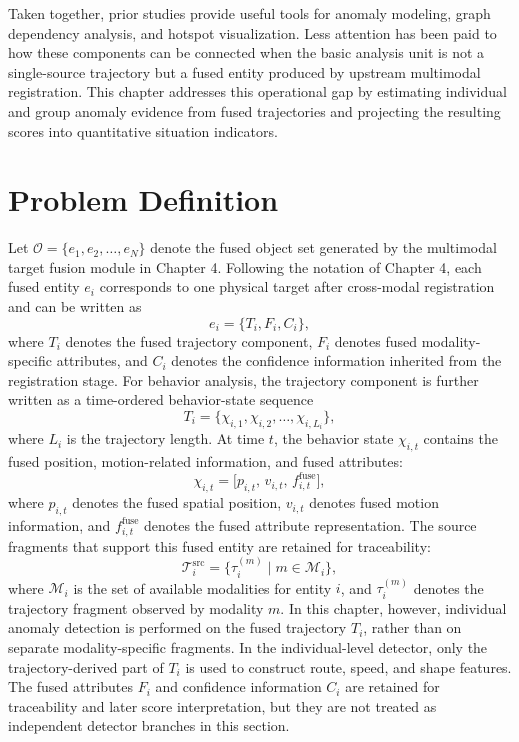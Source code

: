 Taken together, prior studies provide useful tools for anomaly modeling, graph dependency analysis, and hotspot visualization. Less attention has been paid to how these components can be connected when the basic analysis unit is not a single-source trajectory but a fused entity produced by upstream multimodal registration. This chapter addresses this operational gap by estimating individual and group anomaly evidence from fused trajectories and projecting the resulting scores into quantitative situation indicators.

\section{Problem Definition}
Let \(\mathcal{O}=\{e_1,e_2,\ldots,e_N\}\) denote the fused object set generated by the multimodal target fusion module in Chapter 4. Following the notation of Chapter 4, each fused entity \(e_i\) corresponds to one physical target after cross-modal registration and can be written as
\begin{equation}
  e_i=\{T_i,F_i,C_i\},
\end{equation}
where \(T_i\) denotes the fused trajectory component, \(F_i\) denotes fused modality-specific attributes, and \(C_i\) denotes the confidence information inherited from the registration stage. For behavior analysis, the trajectory component is further written as a time-ordered behavior-state sequence
\begin{equation}
  T_i=\{\chi_{i,1},\chi_{i,2},\ldots,\chi_{i,L_i}\},
\end{equation}
where \(L_i\) is the trajectory length. At time \(t\), the behavior state \(\chi_{i,t}\) contains the fused position, motion-related information, and fused attributes:
\begin{equation}
  \chi_{i,t}=\big[p_{i,t},\,v_{i,t},\,f_{i,t}^{\mathrm{fuse}}\big],
\end{equation}
where \(p_{i,t}\) denotes the fused spatial position, \(v_{i,t}\) denotes fused motion information, and \(f_{i,t}^{\mathrm{fuse}}\) denotes the fused attribute representation. The source fragments that support this fused entity are retained for traceability:
\begin{equation}
  \mathcal{T}_i^{\mathrm{src}}=\{\tau_i^{(m)} \mid m\in\mathcal{M}_i\},
\end{equation}
where \(\mathcal{M}_i\) is the set of available modalities for entity \(i\), and \(\tau_i^{(m)}\) denotes the trajectory fragment observed by modality \(m\). In this chapter, however, individual anomaly detection is performed on the fused trajectory \(T_i\), rather than on separate modality-specific fragments. In the individual-level detector, only the trajectory-derived part of \(T_i\) is used to construct route, speed, and shape features. The fused attributes \(F_i\) and confidence information \(C_i\) are retained for traceability and later score interpretation, but they are not treated as independent detector branches in this section.

